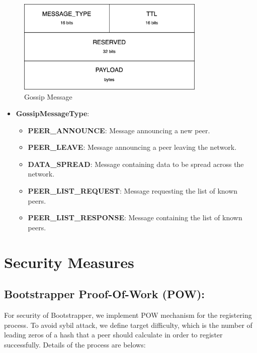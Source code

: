 \begin{figure}[H]
    \centering
    \includegraphics[width=0.8\textwidth]{pics/gossip.message.png}
    \caption{Gossip Message}
\end{figure}

\begin{itemize}
    \item \textbf{GossipMessageType}:
      
        \begin{itemize}
            \item \textbf{PEER\_ANNOUNCE}: Message announcing a new peer.
            \item \textbf{PEER\_LEAVE}: Message announcing a peer leaving the network.
            \item \textbf{DATA\_SPREAD}: Message containing data to be spread across the network.
            \item \textbf{PEER\_LIST\_REQUEST}: Message requesting the list of known peers.
            \item \textbf{PEER\_LIST\_RESPONSE}: Message containing the list of known peers.
        \end{itemize}
\end{itemize}

\section{Security Measures}

\subsection{Bootstrapper Proof-Of-Work (POW):}

For security of Bootstrapper, we implement POW mechanism for the registering process. To avoid sybil attack, we define target difficulty, which is the number of leading zeros of a hash that a peer should calculate in order to register successfully. Details of the process are belows:

